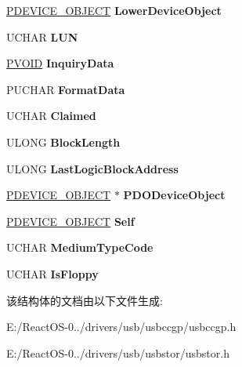 \begin{DoxyCompactItemize}
\hyperlink{struct___d_e_v_i_c_e___o_b_j_e_c_t}{P\+D\+E\+V\+I\+C\+E\+\_\+\+O\+B\+J\+E\+CT} {\bfseries Lower\+Device\+Object}
\item 
\mbox{\label{struct_p_d_o___d_e_v_i_c_e___e_x_t_e_n_s_i_o_n_a68aaf2c4ec54a3c41048f5c88e7d3291}} 
U\+C\+H\+AR {\bfseries L\+UN}
\item 
\mbox{\label{struct_p_d_o___d_e_v_i_c_e___e_x_t_e_n_s_i_o_n_a8b09d328025c5407636afca941562b26}} 
\hyperlink{interfacevoid}{P\+V\+O\+ID} {\bfseries Inquiry\+Data}
\item 
\mbox{\label{struct_p_d_o___d_e_v_i_c_e___e_x_t_e_n_s_i_o_n_aee9d8cd8abe0c7a1d5216b2c841115b6}} 
P\+U\+C\+H\+AR {\bfseries Format\+Data}
\item 
\mbox{\label{struct_p_d_o___d_e_v_i_c_e___e_x_t_e_n_s_i_o_n_a98707bfa109ec1683fe00350b5e9d5dd}} 
U\+C\+H\+AR {\bfseries Claimed}
\item 
\mbox{\label{struct_p_d_o___d_e_v_i_c_e___e_x_t_e_n_s_i_o_n_aa111dcc7e37ee3ef7f78eb247954d80e}} 
U\+L\+O\+NG {\bfseries Block\+Length}
\item 
\mbox{\label{struct_p_d_o___d_e_v_i_c_e___e_x_t_e_n_s_i_o_n_a0e31534ffac3cbe3a73e1dc729c67c24}} 
U\+L\+O\+NG {\bfseries Last\+Logic\+Block\+Address}
\item 
\mbox{\label{struct_p_d_o___d_e_v_i_c_e___e_x_t_e_n_s_i_o_n_a8d1841a7085bc70a6d83fd4b03acbdbf}} 
\hyperlink{struct___d_e_v_i_c_e___o_b_j_e_c_t}{P\+D\+E\+V\+I\+C\+E\+\_\+\+O\+B\+J\+E\+CT} $\ast$ {\bfseries P\+D\+O\+Device\+Object}
\item 
\mbox{\label{struct_p_d_o___d_e_v_i_c_e___e_x_t_e_n_s_i_o_n_af526dc6a7e6dfee7f4d0ac7a2841e294}} 
\hyperlink{struct___d_e_v_i_c_e___o_b_j_e_c_t}{P\+D\+E\+V\+I\+C\+E\+\_\+\+O\+B\+J\+E\+CT} {\bfseries Self}
\item 
\mbox{\label{struct_p_d_o___d_e_v_i_c_e___e_x_t_e_n_s_i_o_n_aa7aa99727bc94206951c3612e356508f}} 
U\+C\+H\+AR {\bfseries Medium\+Type\+Code}
\item 
\mbox{\label{struct_p_d_o___d_e_v_i_c_e___e_x_t_e_n_s_i_o_n_a4c5361cc99bd361ba0acb9ec8ee5519e}} 
U\+C\+H\+AR {\bfseries Is\+Floppy}
\end{DoxyCompactItemize}


该结构体的文档由以下文件生成\+:\begin{DoxyCompactItemize}
\item 
E\+:/\+React\+O\+S-\/0../drivers/usb/usbccgp/usbccgp.\+h\item 
E\+:/\+React\+O\+S-\/0../drivers/usb/usbstor/usbstor.\+h\end{DoxyCompactItemize}
